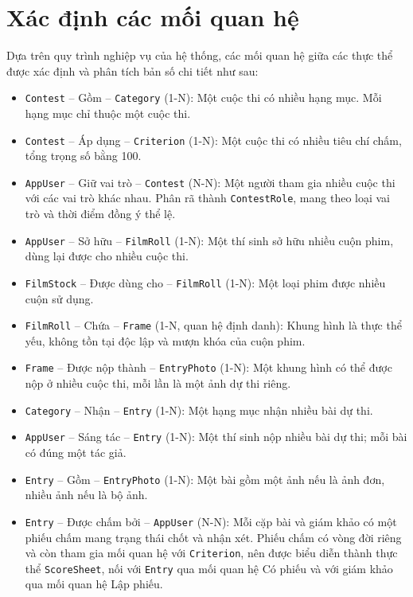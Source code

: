 \section{Xác định các mối quan hệ}

Dựa trên quy trình nghiệp vụ của hệ thống, các mối quan hệ giữa các thực thể được xác định và phân tích bản số chi tiết như sau:


\begin{itemize}
    \item \texttt{Contest} -- Gồm -- \texttt{Category} (1-N): Một cuộc thi có nhiều hạng mục. Mỗi hạng mục chỉ thuộc một cuộc thi.
    \item \texttt{Contest} -- Áp dụng -- \texttt{Criterion} (1-N): Một cuộc thi có nhiều tiêu chí chấm, tổng trọng số bằng 100.
    \item \texttt{AppUser} -- Giữ vai trò -- \texttt{Contest} (N-N): Một người tham gia nhiều cuộc thi với các vai trò khác nhau. Phân rã thành \texttt{ContestRole}, mang theo loại vai trò và thời điểm đồng ý thể lệ.
    \item \texttt{AppUser} -- Sở hữu -- \texttt{FilmRoll} (1-N): Một thí sinh sở hữu nhiều cuộn phim, dùng lại được cho nhiều cuộc thi.
    \item \texttt{FilmStock} -- Được dùng cho -- \texttt{FilmRoll} (1-N): Một loại phim được nhiều cuộn sử dụng.
    \item \texttt{FilmRoll} -- Chứa -- \texttt{Frame} (1-N, quan hệ định danh): Khung hình là thực thể yếu, không tồn tại độc lập và mượn khóa của cuộn phim.
    \item \texttt{Frame} -- Được nộp thành -- \texttt{EntryPhoto} (1-N): Một khung hình có thể được nộp ở nhiều cuộc thi, mỗi lần là một ảnh dự thi riêng.
    \item \texttt{Category} -- Nhận -- \texttt{Entry} (1-N): Một hạng mục nhận nhiều bài dự thi.
    \item \texttt{AppUser} -- Sáng tác -- \texttt{Entry} (1-N): Một thí sinh nộp nhiều bài dự thi; mỗi bài có đúng một tác giả.
    \item \texttt{Entry} -- Gồm -- \texttt{EntryPhoto} (1-N): Một bài gồm một ảnh nếu là ảnh đơn, nhiều ảnh nếu là bộ ảnh.
    \item \texttt{Entry} -- Được chấm bởi -- \texttt{AppUser} (N-N): Mỗi cặp bài và giám khảo có một phiếu chấm mang trạng thái chốt và nhận xét. Phiếu chấm có vòng đời riêng và còn tham gia mối quan hệ với \texttt{Criterion}, nên được biểu diễn thành thực thể \texttt{ScoreSheet}, nối với \texttt{Entry} qua mối quan hệ Có phiếu và với giám khảo qua mối quan hệ Lập phiếu.

\end{itemize}
